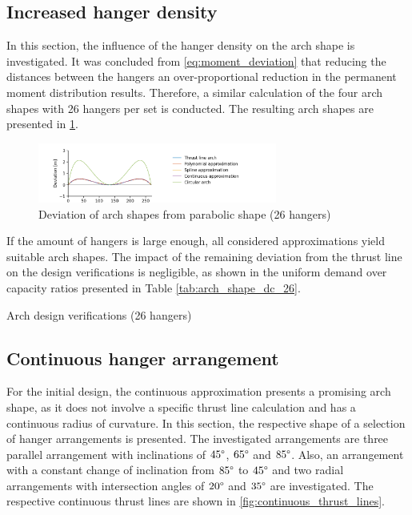 \subsection{Increased hanger density} \label{sec:arch_shape_increased}
In this section, the influence of the hanger density on the arch shape is investigated. It was concluded from \cref{eq:moment_deviation} that reducing the distances between the hangers an over-proportional reduction in the permanent moment distribution results. Therefore, a similar calculation of the four arch shapes with 26 hangers per set is conducted. The resulting arch shapes are presented in \cref{fig:arch_shapes_26}.

\begin{figure}[H]
    \centering
    \includegraphics[trim={1cm 0 3cm 0.48cm},clip, width=0.7\textwidth]{calculations/arch shape/arch_shapes_26.png}
    \caption{Deviation of arch shapes from parabolic shape (26 hangers)}
    \label{fig:arch_shapes_26}
\end{figure}

If the amount of hangers is large enough, all considered approximations yield suitable arch shapes. The impact of the remaining deviation from the thrust line on the design verifications is negligible, as shown in the uniform demand over capacity ratios presented in Table \ref{tab:arch_shape_dc_26}.

\begin{table}[H]
    \centering
    \caption{Arch design verifications (26 hangers)}
    \label{tab:arch_shape_dc_26}
    
\end{table}

\subsection{Continuous hanger arrangement} \label{sec:arch_shape_continuous}
For the initial design, the continuous approximation presents a promising arch shape, as it does not involve a specific thrust line calculation and has a continuous radius of curvature. In this section, the respective shape of a selection of hanger arrangements is presented. The investigated arrangements are three parallel arrangement with inclinations of $45\degree$, $65\degree$ and $85\degree$. Also, an arrangement with a constant change of inclination from $85\degree$ to $45\degree$ and two radial arrangements with intersection angles of $20\degree$ and $35\degree$ are investigated. The respective continuous thrust lines are shown in \cref{fig:continuous_thrust_lines}.

